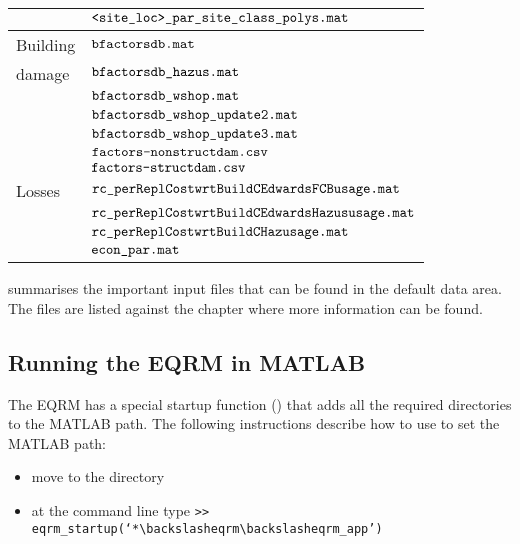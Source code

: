 \begin{table}
\begin{tabular}{|l|p{}|}
 &  $\typeparfile{<site\_loc>\_par}{\_site\_class}{\_polys}{.mat}$ \\
\hline
Building & $\typeparfile{b}{factors}{db}{.mat}$\\
damage & $\typeparfile{bfactors}{db}{\_hazus}{.mat}$ \\
 & $\typeparfile{bfactors}{db}{\_wshop}{.mat}$ \\
 & $\typeparfile{bfactorsdb}{\_wshop}{\_update2}{.mat}$ \\
 & $\typeparfile{bfactorsdb}{\_wshop}{\_update3}{.mat}$ \\
 & $\typeparfile{factors}{-nonstruct}{dam}{.csv}$ \\
 &  $\typeparfile{factors}{-struct}{dam}{.csv}$ \\
\hline
Losses & $\typeparfilelong{rc\_perRepl}{CostwrtBuildC}{EdwardsFCBusage}{.mat}{rc\_perRepl...EdwardsFCBusage}$ \\
& $\typeparfilelong{rc\_perReplCost}{wrtBuildCEdwards}{Hazususage}{.mat}{rc\_perRepl...EdwardsHazususage}$\\
& $\typeparfile{rc\_perReplCost}{wrtBuildC}{Hazusage}{.mat}$\\
& $\typeparfile{econ}{\_p}{ar}{.mat}$\\
\hline
\end{tabular}
\end{table}

 summarises the important input files
that can be found in the default data area. The files are listed
against the chapter where more information can be found.


\subsection{Running the EQRM in MATLAB}
\label{app:runEQRM}


The EQRM has a special startup function
() that adds all the required
directories to the MATLAB path. The following instructions
describe how to use  to set the MATLAB
path:
\begin{itemize}
\item move to the directory
 \item at the
command line type \newline \texttt{>>
eqrm\_startup(`*$\backslash$eqrm$\backslash$eqrm\_app')}
\end{itemize}

